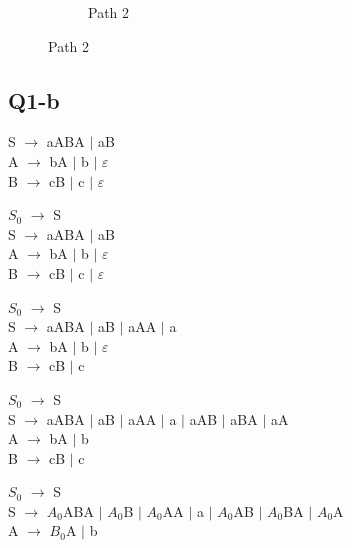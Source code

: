 \documentclass{article}
\begin{document}
\begin{figure}[h]
\begin{subfigure}[h]{0.5\textwidth}
		\caption{Path 2}
		\label{fig:subim2}
	\end{subfigure}
	\label{fig:image2}
\end{figure}

\subsection{Q1-b}
\begin{multicols}{2}
	\noindent
	\begin{minipage}{0.5\textwidth}
		S $\rightarrow$ aABA $\mid$ aB\\
		A $\rightarrow$ bA $\mid$ b $\mid$ $ \varepsilon $\\
		B $ \rightarrow $ cB $ \mid $ c $ \mid $ $ \varepsilon $\\
	\end{minipage}
	\begin{minipage}{0.5\textwidth}
		$S_0$ $\rightarrow$ S\\
		S $\rightarrow$ aABA $\mid$ aB\\
		A $\rightarrow$ bA $\mid$ b $\mid$ $ \varepsilon $\\
		B $ \rightarrow $ cB $ \mid $ c $ \mid $ $ \varepsilon $\\
	\end{minipage}
	\begin{minipage}{0.5\textwidth}
		$S_0$ $\rightarrow$ S\\
		S $\rightarrow$ aABA $\mid$ aB $\mid$ aAA $\mid$ a\\
		A $\rightarrow$ bA $\mid$ b $\mid$ $ \varepsilon $\\
		B $ \rightarrow $ cB $ \mid $ c\\
	\end{minipage}
	\begin{minipage}{0.5\textwidth}
		$S_0$ $\rightarrow$ S\\
		S $\rightarrow$ aABA $\mid$ aB $\mid$ aAA $\mid$ a $\mid$ aAB $\mid$ aBA $\mid$ aA\\
		A $\rightarrow$ bA $\mid$ b \\
		B $ \rightarrow $ cB $ \mid $ c \\
	\end{minipage}
	\begin{minipage}{0.5\textwidth}
		$S_0$ $\rightarrow$ S\\
		S $\rightarrow$ $A_0$ABA $\mid$ $A_0$B $\mid$ $A_0$AA $\mid$ a $\mid$ $A_0$AB $\mid$ $A_0$BA $\mid$ $A_0$A\\
		A $\rightarrow$ $B_0$A $\mid$ b \\

\end{minipage}
\end{multicols}
\end{document}
